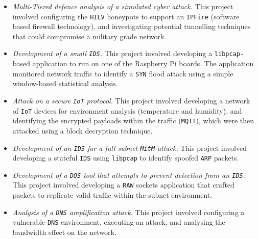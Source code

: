 \documentclass{ieeeaccess}
\begin{document}
\begin{itemize} 
  \item \noindent \textit{Multi-Tiered defence analysis of a simulated cyber
    attack.} This project involved configuring the \texttt{HILV} honeypots to
    support an \texttt{IPFire} (software based firewall technology), and
    investigating potential tunnelling techniques that could compromise a
    military grade network.  
  \item \noindent \textit{Development of a small \texttt{IDS}.} This project
    involved developing a \texttt{libpcap-}based application to run on one of the
    Raspberry Pi boards. The application monitored network
    traffic to identify a \texttt{SYN} flood attack using a simple window-based
    statistical analysis.  
    \item \noindent \textit{Attack on a secure \texttt{IoT} protocol.} This
      project involved developing a network of \texttt{IoT} devices for
      environment analysis (temperature and humidity), and identifying the
      encrypted payloads within the traffic (\texttt{MQTT}), which were then
      attacked using a block decryption technique.
    \item \noindent \textit{Development of an \texttt{IDS} for a full subnet
      \texttt{MitM} attack.} This project involved developing a stateful 
      \texttt{IDS} using \texttt{libpcap} to identify spoofed \texttt{ARP} packets.  
    \item \noindent \textit{Development of a \texttt{DOS} tool that attempts to
      prevent detection from an \texttt{IDS}.} This project involved developing
      a \texttt{RAW} sockets application that crafted packets to
      replicate valid traffic within the subnet environment.  
     \item \noindent \textit{Analysis of a \texttt{DNS} amplification attack.} This
       project involved configuring a vulnerable \texttt{DNS} environment,
       executing an attack, and analysing the bandwidth effect on the network.
\end{itemize}
\end{document}
